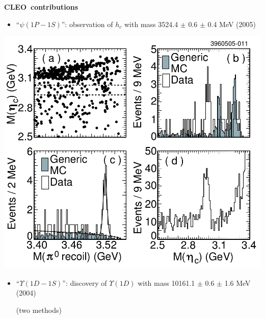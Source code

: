 \documentclass[landscape]{article}
\newenvironment{slide}[1][ ]{\mbox{\bf \boldmath #1 } \vfill}{\vfill \vspace{-1.5 cm} \mbox{ } \pagebreak}
\begin{document}
\begin{slide}[CLEO contributions]

\vspace{-1.5 cm}
\begin{minipage}{0.6\linewidth}
  \begin{itemize}

    \item ``$\psi(1P-1S)$'': observation of $h_c$ with mass
    3524.4 $\pm$ 0.6 $\pm$ 0.4 MeV (2005)

  \end{itemize}
\end{minipage} \hfill \begin{minipage}{0.38\linewidth}
  \includegraphics[width=\linewidth, trim=0 0 8.5cm 7cm, clip=true]{discovery_hc}
\end{minipage}

\begin{minipage}{0.6\linewidth}
  \begin{itemize}

    \item ``$\Upsilon(1D-1S)$'': discovery of $\Upsilon(1D)$ with mass
    10161.1 $\pm$ 0.6 $\pm$ 1.6 MeV (2004)

    (two methods)


\end{itemize}
\end{minipage}
\end{slide}
\end{document}
